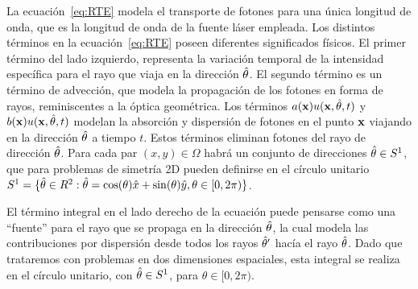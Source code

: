La ecuación~\eqref{eq:RTE} 
modela el transporte de fotones para una única longitud de onda, que es la longitud 
de onda de la fuente láser empleada.
Los distintos términos en la ecuación~\eqref{eq:RTE} poseen 
diferentes significados físicos. El primer término del lado izquierdo, representa la variación temporal  
de la intensidad específica para el rayo que viaja en la dirección $\hat{\theta}$. 
El segundo término es un término de advección, que modela la propagación de 
los fotones en forma de rayos, reminiscentes a la óptica geométrica. Los términos $a(\mathbf{x})u(\mathbf{x},\hat{\theta},t)$ y $b(\mathbf{x})u(\mathbf{x},\hat{\theta},t)$ modelan la 
absorción y dispersión de fotones 
en el punto $\mathbf{x}$ viajando en la dirección $\hat{\theta}$ a tiempo $t$. Estos términos eliminan 
fotones del rayo de dirección $\hat{\theta}$. 
Para cada par $(x,y)\in \Omega$ habrá un conjunto de direcciones $\hat{\theta} \in S^1$, 
que para problemas de simetría 2D 
pueden definirse en el círculo unitario $S^1=\{ \hat{\theta} \in R^2: 
\hat{\theta}=\cos(\theta)\hat x+\sin(\theta) \hat y, \theta \in [0,2\pi)  \}$. 

El término integral en el lado derecho de la ecuación 
puede pensarse como una ``fuente'' para el rayo que se propaga en la dirección $\hat{\theta}$, 
la cual modela las contribuciones por dispersión desde todos los rayos $\hat{\theta}'$ 
hacía el rayo $\hat{\theta}$. Dado que trataremos con problemas en dos dimensiones espaciales, 
esta integral se realiza en el círculo unitario, con $\hat{\theta} \in S^1$, 
para $\theta \in [0,2\pi)$.

